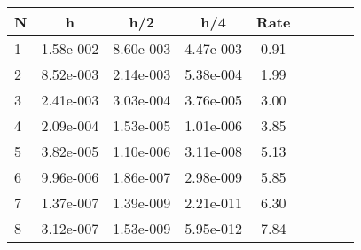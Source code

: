 \begin{tabular}{lcccccccc}
N & h & h/2 & h/4 & Rate\\
\hline
1& 1.58e-002& 8.60e-003& 4.47e-003& 0.91\\
2& 8.52e-003& 2.14e-003& 5.38e-004& 1.99\\
3& 2.41e-003& 3.03e-004& 3.76e-005& 3.00\\
4& 2.09e-004& 1.53e-005& 1.01e-006& 3.85\\
5& 3.82e-005& 1.10e-006& 3.11e-008& 5.13\\
6& 9.96e-006& 1.86e-007& 2.98e-009& 5.85\\
7& 1.37e-007& 1.39e-009& 2.21e-011& 6.30\\
8& 3.12e-007& 1.53e-009& 5.95e-012& 7.84\\
\hline
\end{tabular}
